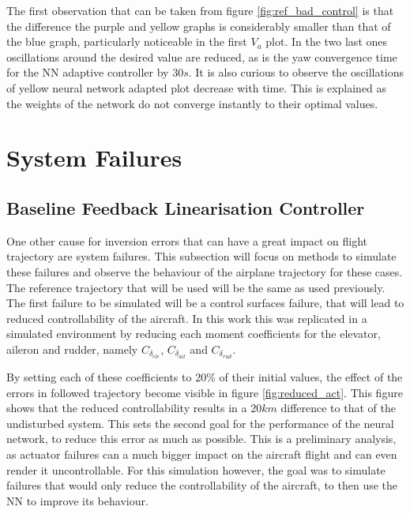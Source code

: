 The first observation that can be taken from figure \ref{fig:ref_bad_control} is that the difference the purple and yellow graphs is considerably smaller than that of the blue graph, particularly noticeable in the first $V_a$ plot. In the two last ones oscillations around the desired value are reduced, as is the yaw convergence time for the NN adaptive controller by $30s$.
It is also curious to observe the oscillations of yellow neural network adapted plot decrease with time. This is explained as the weights of the network do not converge instantly to their optimal values.


\section{System Failures}
\label{section:results/system_failures}

\subsection{Baseline Feedback Linearisation Controller}
One other cause for inversion errors that can have a great impact on flight trajectory are system failures. This subsection will focus on methods to simulate these failures and observe the behaviour of the airplane trajectory for these cases. The reference trajectory that will be used will be the same as used previously. The first failure to be simulated will be a control surfaces failure, that will lead to reduced controllability of the aircraft. In this work this was replicated in a simulated environment by reducing each moment coefficients for the elevator, aileron and rudder, namely $C_{\delta_{ele}}$, $C_{\delta_{ail}}$ and $C_{\delta_{rud}}$.

By setting each of these coefficients to 20\% of their initial values, the effect of the errors in followed trajectory become visible in figure \ref{fig:reduced_act}. This figure shows that the reduced controllability results in a $20km$ difference to that of the undisturbed system. This sets the second goal for the performance of the neural network, to reduce this error as much as possible. This is a preliminary analysis, as actuator failures can a much bigger impact on the aircraft flight and can even render it uncontrollable. For this simulation however, the goal was to simulate failures that would only reduce the controllability of the aircraft, to then use the NN to improve its behaviour. 


